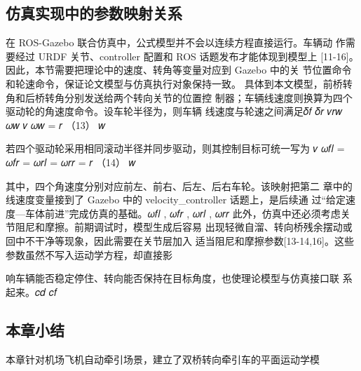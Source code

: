 \subsection{仿真实现中的参数映射关系}
在 ROS-Gazebo 联合仿真中，公式模型并不会以连续方程直接运行。车辆动
作需要经过 URDF 关节、controller 配置和 ROS 话题发布才能体现到模型上
[11-16]。因此，本节需要把理论中的速度、转角等变量对应到 Gazebo 中的关
节位置命令和轮速命令，保证论文模型与仿真执行对象保持一致。
具体到本文模型，前桥转角和后桥转角分别发送给两个转向关节的位置控
制器；车辆线速度则换算为四个驱动轮的角速度命令。设车轮半径为，则车辆
线速度与轮速之间满足𝛿𝑓 𝛿𝑟 𝑣𝑟𝑤 𝜔𝑤
𝑣
𝜔𝑤 = 𝑟                   （13）
𝑤



若四个驱动轮采用相同滚动半径并同步驱动，则其控制目标可统一写为
𝑣
𝜔𝑓𝑙 = 𝜔𝑓𝑟 = 𝜔𝑟𝑙 = 𝜔𝑟𝑟 = 𝑟         （14）
𝑤



其中，四个角速度分别对应前左、前右、后左、后右车轮。该映射把第二
章中的线速度变量接到了 Gazebo 中的 velocity\_controller 话题上，是后续通
过“给定速度—车体前进”完成仿真的基础。𝜔𝑓𝑙 , 𝜔𝑓𝑟 , 𝜔𝑟𝑙 , 𝜔𝑟𝑟
此外，仿真中还必须考虑关节阻尼和摩擦。前期调试时，模型生成后容易
出现轻微自溜、转向桥残余摆动或回中不干净等现象，因此需要在关节层加入
适当阻尼和摩擦参数[13-14,16]。这些参数虽然不写入运动学方程，却直接影







响车辆能否稳定停住、转向能否保持在目标角度，也使理论模型与仿真接口联
系起来。𝑐𝑑 𝑐𝑓
\subsection{本章小结}
本章针对机场飞机自动牵引场景，建立了双桥转向牵引车的平面运动学模